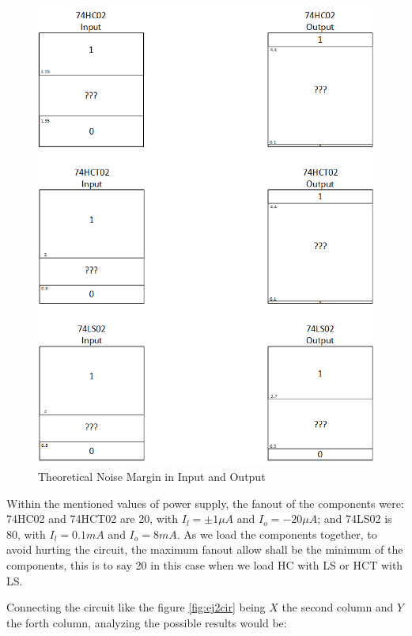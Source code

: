 	 \begin{figure}[h!]
        \centering
        \includegraphics[scale=0.5]{../Exercise2/dataaa2.png}
        \caption{\color{cyan}Theoretical Noise Margin in Input and Output}
        \label{fig:ej2thnm}
    \end{figure}
    
    Within the mentioned values of power supply, the fanout of the components were: 74HC02 and 74HCT02 are 20, with $I_l =\pm1{\mu}A$ and $I_o=-20{\mu}A$; and 74LS02 is 80, with $I_l =0.1mA$ and $I_o=8mA$. As we load the components together, to avoid hurting the circuit, the maximum fanout allow shall be the minimum of the components, this is to say 20 in this case when we load HC with LS or HCT with LS. 
    
    Connecting the circuit like the figure \ref{fig:ej2cir} being $X$ the second column and $Y$ the forth column, analyzing the possible results would be:

